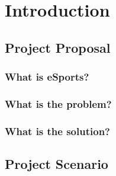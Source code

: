 \chapter{Introduction}
\hrulefill

\section{Project Proposal}
\lipsum[1]

\subsection{What is eSports?}
\lipsum[1]

\subsection{What is the problem?}
\lipsum[1]

\subsection{What is the solution?}
\lipsum[1][1-5]

\clearpage


\section{Project Scenario}
\lipsum[1-5]